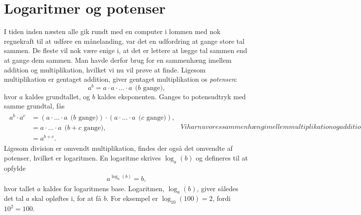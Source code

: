 \section{Logaritmer og potenser} \label{mat:sec:log}
I tiden inden næsten alle gik rundt med en computer i lommen med nok regnekraft til at udføre en månelanding, var det en udfordring at gange store tal sammen.
De fleste vil nok være enige i, at det er lettere at lægge tal sammen end at gange dem sammen. Man havde derfor brug for en sammenhæng imellem addition og multiplikation, hvilket vi nu vil prøve at finde.
Ligesom multiplikation er gentaget addition, giver gentaget multiplikation os \emph{potensen}:
$$
a^b=a\cdot a\cdot \dots{} \cdot a~~\text{($b$ gange)},
$$
hvor $a$ kaldes grundtallet, og $b$ kaldes eksponenten. Ganges to potensudtryk med samme grundtal, fås
%
\begin{subequations} \label{mat:eq:exp_regel}
\begin{align}
\begin{aligned} \label{mat:eq:exp_regel1}
   a^b\cdot a^c&=(a\cdot \dots{} \cdot a~~\text{($b$ gange)}) \cdot (a\cdot \dots{} \cdot a~~\text{($c$ gange)}), \\
   &=a\cdot \dots{} \cdot a~~\text{($b+c$ gange)}, \\
   &=a^{b+c}.
\end{aligned}
\end{align}
%
Vi har nu vores sammenhæng imellem multiplikation og addition, men inden vi fortsætter, bemærker vi to andre potensregneregler:
%
\begin{align}
    \frac{a^b}{a^c}&=a^{b-c}, \label{mat:eq:exp_regel2} \\
    \left(a^b\right)^c&=a^{bc}.\label{mat:eq:exp_regel3}
\end{align}
\end{subequations}
%
Ligesom division er omvendt multiplikation, findes der også det omvendte af potenser, hvilket er logaritmen. En logaritme skrives $\log_a(b)$ og defineres til at opfylde
%
\begin{align} \label{mat:eq:log_def}
     a^{\log_a(b)} = b,
\end{align}
%
hvor tallet $a$ kaldes for logaritmens base. Logaritmen, $\log_a(b)$, giver således det tal $a$ skal opløftes i, for at få $b$. For eksempel er $\log_{10}(100)=2$, fordi $10^2 = 100$. 

